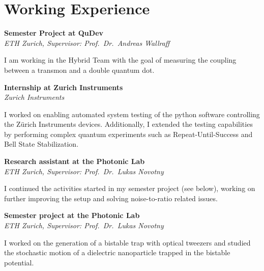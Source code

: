 \documentclass[a4paper,10pt]{article}
\begin{document}
\begin{adjustbox}{valign=t}
\begin{minipage}{0.6\textwidth} %

\section*{Working Experience}
\begin{description}
\setlength\itemsep{-1em}
\item[\normalfont \textcolor{ColorTwo}{mar. 2022 -- Present}] 
	\textbf{Semester Project at QuDev}\\
	\emph{ETH Zurich, Supervisor: Prof.\ Dr.\ Andreas Wallraff}
	\begin{spacing}{1.1}
		\small
	I am working in the Hybrid Team with the goal of measuring the coupling between a transmon and a double quantum dot.
	\end{spacing}
\item[\normalfont \textcolor{ColorTwo}{Sep. 2022 -- Mar. 2023.}] 
	\textbf{Internship at Zurich Instruments}\\
	\emph{Zurich Instruments}
	\begin{spacing}{1.1}
		\small
	I worked on enabling automated system testing of the python software controlling the Zürich Instruments devices. Additionally, I extended the testing capabilities by performing complex quantum experiments such as Repeat-Until-Success and Bell State Stabilization.
	\end{spacing}
\item[\normalfont \textcolor{ColorTwo}{Jul. 2022 -- Aug. 2022.}] 
	\textbf{Research assistant at the Photonic Lab}\\
	\emph{ETH Zurich, Supervisor: Prof.\ Dr.\ Lukas Novotny}
	\begin{spacing}{1.1}
		\small
	I continued the activities started in my semester project (see below), working on further improving the setup and solving noise-to-ratio related issues.
	\end{spacing}
\item[\normalfont \textcolor{ColorTwo}{Mar. 2022 -- Jun. 2022.}] 
	\textbf{Semester project at the Photonic Lab}\\
	\emph{ETH Zurich, Supervisor: Prof.\ Dr.\ Lukas Novotny}
	\begin{spacing}{1.2}
		\small
	I worked on the generation of a bistable trap with optical tweezers and studied the stochastic motion of a dielectric nanoparticle trapped in the bistable potential.
	\end{spacing}
\end{description}
\vspace{-1cm}

\end{minipage}
\end{adjustbox}
\end{document}
